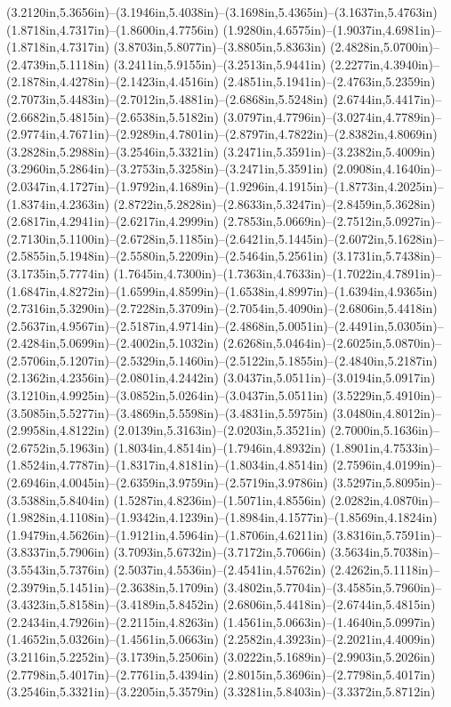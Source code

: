 (3.2120in,5.3656in)--(3.1946in,5.4038in)--(3.1698in,5.4365in)--(3.1637in,5.4763in) (1.8718in,4.7317in)--(1.8600in,4.7756in) (1.9280in,4.6575in)--(1.9037in,4.6981in)--(1.8718in,4.7317in) (3.8703in,5.8077in)--(3.8805in,5.8363in) (2.4828in,5.0700in)--(2.4739in,5.1118in) (3.2411in,5.9155in)--(3.2513in,5.9441in) (2.2277in,4.3940in)--(2.1878in,4.4278in)--(2.1423in,4.4516in) (2.4851in,5.1941in)--(2.4763in,5.2359in) (2.7073in,5.4483in)--(2.7012in,5.4881in)--(2.6868in,5.5248in) (2.6744in,5.4417in)--(2.6682in,5.4815in)--(2.6538in,5.5182in) (3.0797in,4.7796in)--(3.0274in,4.7789in)--(2.9774in,4.7671in)--(2.9289in,4.7801in)--(2.8797in,4.7822in)--(2.8382in,4.8069in) (3.2828in,5.2988in)--(3.2546in,5.3321in) (3.2471in,5.3591in)--(3.2382in,5.4009in) (3.2960in,5.2864in)--(3.2753in,5.3258in)--(3.2471in,5.3591in) (2.0908in,4.1640in)--(2.0347in,4.1727in)--(1.9792in,4.1689in)--(1.9296in,4.1915in)--(1.8773in,4.2025in)--(1.8374in,4.2363in) (2.8722in,5.2828in)--(2.8633in,5.3247in)--(2.8459in,5.3628in) (2.6817in,4.2941in)--(2.6217in,4.2999in) (2.7853in,5.0669in)--(2.7512in,5.0927in)--(2.7130in,5.1100in)--(2.6728in,5.1185in)--(2.6421in,5.1445in)--(2.6072in,5.1628in)--(2.5855in,5.1948in)--(2.5580in,5.2209in)--(2.5464in,5.2561in) (3.1731in,5.7438in)--(3.1735in,5.7774in) (1.7645in,4.7300in)--(1.7363in,4.7633in)--(1.7022in,4.7891in)--(1.6847in,4.8272in)--(1.6599in,4.8599in)--(1.6538in,4.8997in)--(1.6394in,4.9365in) (2.7316in,5.3290in)--(2.7228in,5.3709in)--(2.7054in,5.4090in)--(2.6806in,5.4418in) (2.5637in,4.9567in)--(2.5187in,4.9714in)--(2.4868in,5.0051in)--(2.4491in,5.0305in)--(2.4284in,5.0699in)--(2.4002in,5.1032in) (2.6268in,5.0464in)--(2.6025in,5.0870in)--(2.5706in,5.1207in)--(2.5329in,5.1460in)--(2.5122in,5.1855in)--(2.4840in,5.2187in) (2.1362in,4.2356in)--(2.0801in,4.2442in) (3.0437in,5.0511in)--(3.0194in,5.0917in) (3.1210in,4.9925in)--(3.0852in,5.0264in)--(3.0437in,5.0511in) (3.5229in,5.4910in)--(3.5085in,5.5277in)--(3.4869in,5.5598in)--(3.4831in,5.5975in) (3.0480in,4.8012in)--(2.9958in,4.8122in) (2.0139in,5.3163in)--(2.0203in,5.3521in) (2.7000in,5.1636in)--(2.6752in,5.1963in) (1.8034in,4.8514in)--(1.7946in,4.8932in) (1.8901in,4.7533in)--(1.8524in,4.7787in)--(1.8317in,4.8181in)--(1.8034in,4.8514in) (2.7596in,4.0199in)--(2.6946in,4.0045in)--(2.6359in,3.9759in)--(2.5719in,3.9786in) (3.5297in,5.8095in)--(3.5388in,5.8404in) (1.5287in,4.8236in)--(1.5071in,4.8556in) (2.0282in,4.0870in)--(1.9828in,4.1108in)--(1.9342in,4.1239in)--(1.8984in,4.1577in)--(1.8569in,4.1824in) (1.9479in,4.5626in)--(1.9121in,4.5964in)--(1.8706in,4.6211in) (3.8316in,5.7591in)--(3.8337in,5.7906in) (3.7093in,5.6732in)--(3.7172in,5.7066in) (3.5634in,5.7038in)--(3.5543in,5.7376in) (2.5037in,4.5536in)--(2.4541in,4.5762in) (2.4262in,5.1118in)--(2.3979in,5.1451in)--(2.3638in,5.1709in) (3.4802in,5.7704in)--(3.4585in,5.7960in)--(3.4323in,5.8158in)--(3.4189in,5.8452in) (2.6806in,5.4418in)--(2.6744in,5.4815in) (2.2434in,4.7926in)--(2.2115in,4.8263in) (1.4561in,5.0663in)--(1.4640in,5.0997in) (1.4652in,5.0326in)--(1.4561in,5.0663in) (2.2582in,4.3923in)--(2.2021in,4.4009in) (3.2116in,5.2252in)--(3.1739in,5.2506in) (3.0222in,5.1689in)--(2.9903in,5.2026in) (2.7798in,5.4017in)--(2.7761in,5.4394in) (2.8015in,5.3696in)--(2.7798in,5.4017in) (3.2546in,5.3321in)--(3.2205in,5.3579in) (3.3281in,5.8403in)--(3.3372in,5.8712in) 